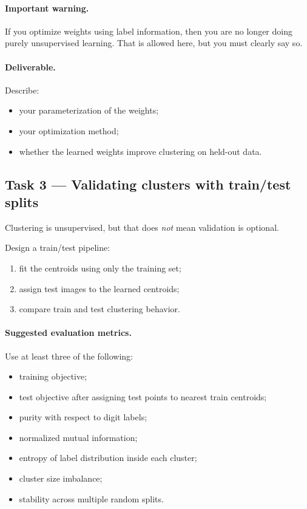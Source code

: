 \documentclass[11pt]{article}
\begin{document}
\paragraph{Important warning.}
If you optimize weights using label information, then you are no longer doing purely unsupervised learning. That is allowed here, but you must clearly say so.

\paragraph{Deliverable.}
Describe:
\begin{itemize}[itemsep=2pt]
    \item your parameterization of the weights;
    \item your optimization method;
    \item whether the learned weights improve clustering on held-out data.
\end{itemize}

\subsection*{Task 3 --- Validating clusters with train/test splits}

Clustering is unsupervised, but that does \emph{not} mean validation is optional.

Design a train/test pipeline:
\begin{enumerate}[itemsep=2pt]
    \item fit the centroids using only the training set;
    \item assign test images to the learned centroids;
    \item compare train and test clustering behavior.
\end{enumerate}

\paragraph{Suggested evaluation metrics.}
Use at least three of the following:
\begin{itemize}[itemsep=2pt]
    \item training objective;
    \item test objective after assigning test points to nearest train centroids;
    \item purity with respect to digit labels;
    \item normalized mutual information;
    \item entropy of label distribution inside each cluster;
    \item cluster size imbalance;
    \item stability across multiple random splits.
\end{itemize}
\end{document}
